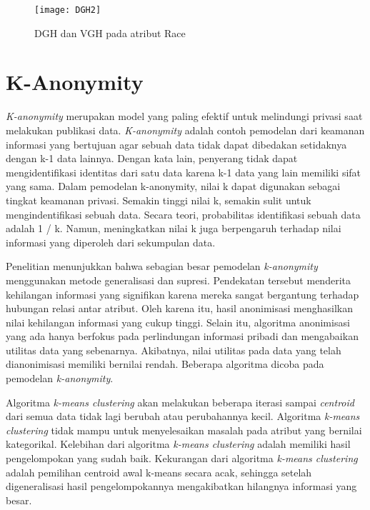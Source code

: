 \begin{figure}[H]
	\centering
	\texttt{[image: DGH2]}
	\caption{DGH dan VGH pada atribut Race}
	\label{fig:DGH2}
\end{figure}

\section{K-Anonymity}
\textit{K-anonymity} merupakan model yang paling efektif untuk melindungi privasi saat melakukan publikasi data. \textit{K-anonymity} adalah contoh pemodelan dari keamanan informasi yang bertujuan agar sebuah data tidak dapat dibedakan setidaknya dengan k-1 data lainnya. Dengan kata lain, penyerang tidak dapat mengidentifikasi identitas dari satu data karena k-1 data yang lain memiliki sifat yang sama. Dalam pemodelan k-anonymity, nilai k dapat digunakan sebagai tingkat keamanan privasi. Semakin tinggi nilai k, semakin sulit untuk mengindentifikasi sebuah data. Secara teori, probabilitas identifikasi sebuah data adalah 1 / k. Namun, meningkatkan nilai k juga berpengaruh terhadap nilai informasi yang diperoleh dari sekumpulan data.

\par Penelitian menunjukkan bahwa sebagian besar pemodelan \textit{k-anonymity} menggunakan metode generalisasi dan supresi. Pendekatan tersebut menderita kehilangan informasi yang signifikan karena mereka sangat bergantung terhadap hubungan relasi antar atribut. Oleh karena itu, hasil anonimisasi menghasilkan nilai kehilangan informasi yang cukup tinggi. Selain itu, algoritma anonimisasi yang ada hanya berfokus pada perlindungan informasi pribadi dan mengabaikan utilitas data yang sebenarnya. Akibatnya, nilai utilitas pada data yang telah dianonimisasi memiliki bernilai rendah. Beberapa algoritma dicoba pada pemodelan \textit{k-anonymity}.

\par Algoritma \textit{k-means clustering} akan melakukan beberapa iterasi sampai \textit{centroid} dari semua data tidak lagi berubah atau perubahannya kecil. Algoritma \textit{k-means clustering} tidak mampu untuk menyelesaikan masalah pada atribut yang bernilai kategorikal. Kelebihan dari algoritma \textit{k-means clustering} adalah memiliki hasil pengelompokan yang sudah baik. Kekurangan dari algoritma \textit{k-means clustering} adalah pemilihan centroid awal k-means secara acak, sehingga setelah digeneralisasi hasil pengelompokannya mengakibatkan hilangnya informasi yang besar.

